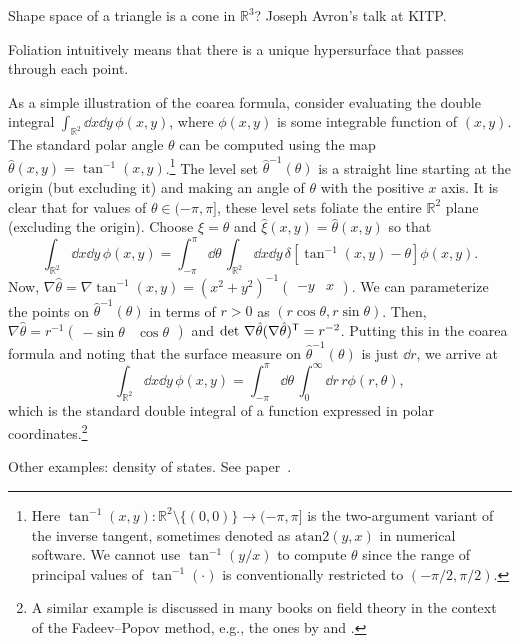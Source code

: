 Shape space of a triangle is a cone in $\mathbb{R}^{3}$? Joseph Avron's talk at KITP.

Foliation intuitively means that there is a unique hypersurface that passes through each point.

\begin{example}
  As a simple illustration of the coarea formula, consider evaluating the double integral $\int_{\mathbb{R}^{2}} \dd{x}\dd{y}\, \phi(x,y)$, where $\phi(x, y)$ is some integrable function of $(x, y)$.
  The standard polar angle $\theta$ can be computed using the map $\hat{\theta}(x, y) = \tan^{-1}(x, y)$.\footnote{Here $\tan^{-1}(x, y): \mathbb{R}^{2} \setminus \{(0,0)\} \to (-\pi, \pi]$ is the two-argument variant of the inverse tangent, sometimes denoted as $\mathrm{atan2}(y, x)$ in numerical software.  We cannot use $\tan^{-1}(y/x)$ to compute $\theta$ since the range of principal values of $\tan^{-1}(\cdot)$ is conventionally restricted to $(-\pi/2, \pi/2)$.}
  The level set $\hat{\theta}^{-1}(\theta)$ is a straight line starting at the origin (but excluding it) and making an angle of $\theta$ with the positive $x$ axis.
  It is clear that for values of $\theta \in (-\pi, \pi]$, these level sets foliate the entire $\mathbb{R}^{2}$ plane (excluding the origin).
  Choose $\xi = \theta$ and $\hat{\xi}(x, y) = \hat{\theta}(x, y)$ so that
  \begin{equation}
    \int_{\mathbb{R}^{2}} \dd{x}\dd{y}\, \phi(x, y) = \int_{-\pi}^{\pi} \dd\theta\, \int_{\mathbb{R}^{2}} \dd{x}\dd{y}\, \delta[\tan^{-1}(x, y) - \theta] \phi(x, y).
  \end{equation}
  Now, $\nabla\hat{\theta} = \nabla\tan^{-1}(x, y) = (x^{2} + y^{2})^{-1}\begin{pmatrix}-y & x\end{pmatrix}$.
  We can parameterize the points on $\hat{\theta}^{-1}(\theta)$ in terms of $r > 0$ as $(r\cos{\theta}, r\sin{\theta})$.
  Then, $\nabla\hat{\theta} = r^{-1}\begin{pmatrix}-\sin\theta & \cos\theta\end{pmatrix}$ and $\det\,\nabla\hat{\theta}(\nabla\hat{\theta})^\mathsf{T} = r^{-2}$.
  Putting this in the coarea formula and noting that the surface measure on $\hat{\theta}^{-1}(\theta)$ is just $\dd{r}$, we arrive at
  \begin{equation}
    \int_{\mathbb{R}^{2}} \dd{x}\dd{y}\, \phi(x, y) = \int_{-\pi}^{\pi} \dd\theta\, \int_0^{\infty} \dd{r}\, r \phi(r, \theta),
  \end{equation}
  which is the standard double integral of a function expressed in polar coordinates.\footnote{A similar example is discussed in many books on field theory in the context of the Fadeev--Popov method, e.g., the ones by \citet[Section 7.2]{ryder1996} and \citet[Part III.4]{zee2010}.}
  \altqed
\end{example}

Other examples: density of states.  See paper~\cite{gillespie1983}.

\printpagenotes
